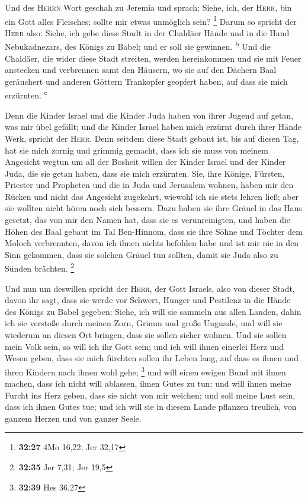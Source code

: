  Und des \textsc{Herrn} Wort geschah zu Jeremia und
sprach:  Siehe, ich, der \textsc{Herr}, bin ein Gott
alles Fleisches; sollte mir etwas unmöglich sein? \footnote{\textbf{32:27}
  4Mo 16,22; Jer 32,17}  Darum so spricht der
\textsc{Herr} also: Siehe, ich gebe diese Stadt in der Chaldäer Hände
und in die Hand Nebukadnezars, des Königs zu Babel; und er soll sie
gewinnen. \textsuperscript{b}  Und die Chaldäer, die
wider diese Stadt streiten, werden hereinkommen und sie mit Feuer
anstecken und verbrennen samt den Häusern, wo sie auf den Dächern Baal
geräuchert und anderen Göttern Trankopfer geopfert haben, auf dass sie
mich erzürnten. \textsuperscript{c}

 Denn die Kinder Israel und die Kinder Juda haben von
ihrer Jugend auf getan, was mir übel gefällt; und die Kinder Israel
haben mich erzürnt durch ihrer Hände Werk, spricht der \textsc{Herr}.
 Denn seitdem diese Stadt gebaut ist, bis auf diesen Tag,
hat sie mich zornig und grimmig gemacht, dass ich sie muss von meinem
Angesicht wegtun  um all der Bosheit willen der Kinder
Israel und der Kinder Juda, die sie getan haben, dass sie mich
erzürnten. Sie, ihre Könige, Fürsten, Priester und Propheten und die in
Juda und Jerusalem wohnen,  haben mir den Rücken und
nicht das Angesicht zugekehrt, wiewohl ich sie stets lehren ließ; aber
sie wollten nicht hören noch sich bessern.  Dazu haben
sie ihre Gräuel in das Haus gesetzt, das von mir den Namen hat, dass sie
es verunreinigten,  und haben die Höhen des Baal gebaut
im Tal Ben-Hinnom, dass sie ihre Söhne und Töchter dem Moloch
verbrennten, davon ich ihnen nichts befohlen habe und ist mir nie in den
Sinn gekommen, dass sie solchen Gräuel tun sollten, damit sie Juda also
zu Sünden brächten. \footnote{\textbf{32:35} Jer 7,31; Jer 19,5}

 Und nun um deswillen spricht der \textsc{Herr}, der Gott
Israels, also von dieser Stadt, davon ihr sagt, dass sie werde vor
Schwert, Hunger und Pestilenz in die Hände des Königs zu Babel gegeben:
 Siehe, ich will sie sammeln aus allen Landen, dahin ich
sie verstoße durch meinen Zorn, Grimm und große Ungnade, und will sie
wiederum an diesen Ort bringen, dass sie sollen sicher wohnen.
 Und sie sollen mein Volk sein, so will ich ihr Gott
sein;  und ich will ihnen einerlei Herz und Wesen geben,
dass sie mich fürchten sollen ihr Leben lang, auf dass es ihnen und
ihren Kindern nach ihnen wohl gehe; \footnote{\textbf{32:39} Hes 36,27}
 und will einen ewigen Bund mit ihnen machen, dass ich
nicht will ablassen, ihnen Gutes zu tun; und will ihnen meine Furcht ins
Herz geben, dass sie nicht von mir weichen;  und soll
meine Lust sein, dass ich ihnen Gutes tue; und ich will sie in diesem
Lande pflanzen treulich, von ganzem Herzen und von ganzer Seele.

